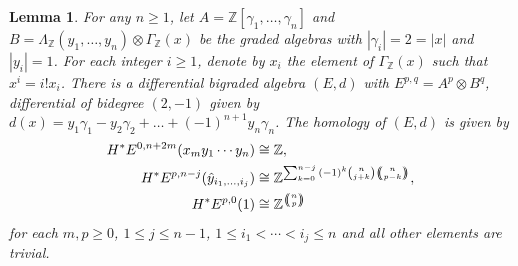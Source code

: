 \documentclass{article}
\theoremstyle{plain}
\newtheorem{lem}[thm]{Lemma}
\theoremstyle{definition}
\numberwithin{thm}{section}
\begin{document}
			\begin{lem}\label{lem:1to1spec}
					For any $n\geq 1$, let $A=\mathbb{Z}[\gamma_1,\dots,\gamma_n]$ and $B=\Lambda_\mathbb{Z}(y_1,\dots,y_n)\otimes\Gamma_{\mathbb{Z}}(x)$
					be the graded algebras with $|\gamma_i|=2=|x|$ and $|y_i|=1$.
					For each integer $i\geq 1$, denote by $x_i$ the element of $\Gamma_{\mathbb{Z}}(x)$ such that $x^i = i!x_i$.
					There is a differential bigraded algebra $(E,d)$
					with $E^{p,q}=A^p\otimes B^q$, differential of bidegree $(2,-1)$ given by $d(x)=y_1\gamma_1-y_2\gamma_2+\dots+(-1)^{n+1}y_n\gamma_n$.
					The homology of $(E,d)$ is given by
					\begin{align*}
						H^*E^{0,n+2m}(x_m y_1\cdots y_n)&\cong\mathbb{Z}, \\
						H^*E^{p,n-j}(\hat{y}_{i_1,\dots,i_j})&\cong\mathbb{Z}^{\sum_{k=0}^{n-j}{(-1)^k\binom{n}{j+k}{\ensuremath{\:\left(\kern-.5em\left(\genfrac{}{}{0pt}{}{{n}}{{p-k}}\right)\kern-.5em\right)\:}}}},\\
						H^*E^{p,0}(1)&\cong\mathbb{Z}^{{\ensuremath{\:\left(\kern-.5em\left(\genfrac{}{}{0pt}{}{{n}}{{p}}\right)\kern-.5em\right)\:}}}
					\end{align*}
					for each $m,p\geq 0$, $1\leq j\leq n-1$, $1\leq i_1<\cdots<i_j\leq n$ and all other elements are trivial.
			\end{lem}
\end{document}
